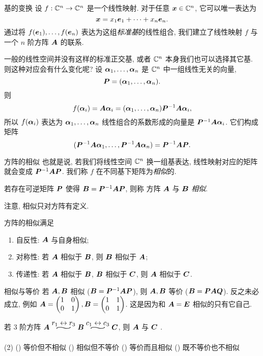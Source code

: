 \begin{frame}{基的变换}
	\onslide<+->
	设 $f:\BC^n\to \BC^n$ 是一个线性映射.
	\onslide<+->
	对于任意 $\bfx\in \BC^n$, 它可以唯一表达为
	\[\bfx=x_1\bfe_1+\cdots+x_n\bfe_n.\]
	\onslide<+->
	通过将 $f(\bfe_1),\dots,f(\bfe_n)$ 表达为这组\emph{标准基}的线性组合, 我们建立了线性映射 $f$ 与一个 $n$ 阶方阵 $\bfA$ 的联系.

	\onslide<+->
	一般的线性空间并没有这样的标准正交基, 或者 $\BC^n$ 本身我们也可以选择其它基.
	\onslide<+->
	则这种对应会有什么变化呢?
	\onslide<+->
	设 $\bma_1,\dots,\bma_n$ 是 $\BC^n$ 中一组线性无关的向量, 
	\[\bfP=(\bma_1,\dots,\bma_n).\]
	\onslide<+->
	则
	\[f(\bma_i)=\bfA\bma_i=(\bma_1,\dots,\bma_n)\bfP^{-1}\bfA\bma_i,\]
	所以 $f(\bma_i)$ 表达为 $\bma_1,\dots,\bma_n$ 线性组合的系数形成的向量是 $\bfP^{-1}\bfA\bma_i$.
	\onslide<+->
	它们构成矩阵
	\[(\bfP^{-1}\bfA\bma_1,\dots,\bfP^{-1}\bfA\bma_n)=\bfP^{-1}\bfA\bfP.\]
\end{frame}


\begin{frame}{方阵的相似}
	\onslide<+->
	也就是说, 若我们将线性空间 $\BC^n$ 换一组基表达, 线性映射对应的矩阵就会变成 $\bfP^{-1}\bfA\bfP$.
	\onslide<+->
	我们称 $f$ 在不同基下矩阵为\emph{相似}的.
	\onslide<+->
	\begin{definition}
		若存在可逆矩阵 $\bfP$ 使得 $\bfB=\bfP^{-1}\bfA\bfP$, 则称 方阵 $\bfA$ 与 $\bfB$ \emph{相似}.
	\end{definition}
	\onslide<+->
	注意, 相似只对方阵有定义.
	\onslide<+->
	\begin{proposition}
		方阵的相似满足
		\begin{enumerate}
			\item 自反性: $\bfA$ 与自身相似;
			\item 对称性: 若 $\bfA$ 相似于 $\bfB$, 则 $\bfB$ 相似于 $\bfA$;
			\item 传递性: 若 $\bfA$ 相似于 $\bfB$, $\bfB$ 相似于 $\bfC$, 则 $\bfA$ 相似于 $\bfC$.
		\end{enumerate}
	\end{proposition}
\end{frame}


\begin{frame}{相似与等价}
	\onslide<+->
	若 $\bfA,\bfB$ 相似 ($\bfB=\bfP^{-1}\bfA\bfP$), 则 $\bfA,\bfB$ 等价 ($\bfB=\bfP\bfA\bfQ$).
		反之未必成立, 例如 $\bfA=\begin{pmatrix}
			1&0\\
			0&1
		\end{pmatrix}, \bfB=\begin{pmatrix}
			1&1\\
			0&1
		\end{pmatrix}$.
		这是因为和 $\bfA=\bfE$ 相似的只有它自己.
	\onslide<+->
	\begin{example}
		若 $3$ 阶方阵 $\bfA\wsim{r_1\swap r_3}{}\bfB\wsim{c_1\swap c_3}{}\bfC$, 则 $\bfA$ 与 $\bfC$ .
		\begin{taskschoice}(2)
			() 等价但不相似
			() 相似但不等价
			() 等价而且相似
			() 既不等价也不相似
		\end{taskschoice}
	\end{example}
\end{frame}


